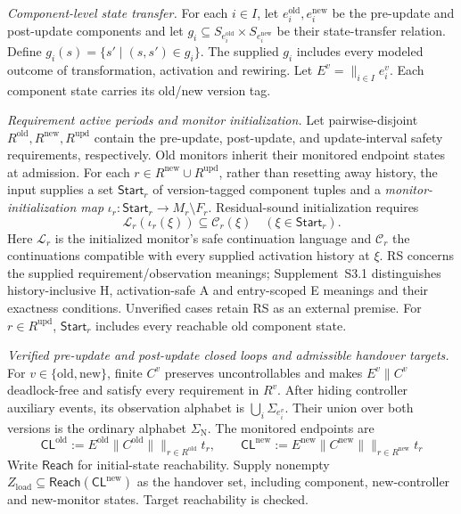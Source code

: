 \documentclass[acmsmall,screen,review,anonymous]{acmart}
\newcommand{\Reach}{\mathsf{Reach}}
\newcommand{\SigmaN}{\Sigma_{\mathrm{N}}}
\newcommand{\CLnew}{\mathsf{CL}^{\mathrm{new}}}
\begin{document}
\begin{definition}
\label{def:fg-inputs}
\label{def:update_plan}
\emph{Component-level state transfer.}
For each $i\in I$, let $e_i^{\mathrm{old}},e_i^{\mathrm{new}}$ be the pre-update and post-update components and let $g_i\subseteq S_{e_i^{\mathrm{old}}}\times S_{e_i^{\mathrm{new}}}$ be their state-transfer relation.
  Define $g_i(s)=\{s'\mid(s,s')\in g_i\}$. The supplied $g_i$ includes every modeled outcome of transformation, activation and rewiring. Let $E^v=\mathop{\parallel}_{i\in I}e_i^v$. Each component state carries its old/new version tag.

\par\noindent\emph{Requirement active periods and monitor initialization.}
Let pairwise-disjoint $R^{\mathrm{old}},R^{\mathrm{new}},R^{\mathrm{upd}}$ contain the pre-update, post-update, and update-interval safety requirements, respectively.
Old monitors inherit their monitored endpoint states at admission. For each $r\in R^{\mathrm{new}}\cup R^{\mathrm{upd}}$, rather than resetting away history, the input supplies a set $\mathsf{Start}_r$ of version-tagged component tuples and a \emph{monitor-initialization map} $\iota_r:\mathsf{Start}_r\to M_r\setminus F_r$.
Residual-sound initialization requires
  \[
    \mathcal L_r(\iota_r(\xi))\subseteq\mathcal C_r(\xi)
    \quad(\xi\in\mathsf{Start}_r).
    \tag{RS}\label{eq:residual-soundness}
  \]
Here $\mathcal L_r$ is the initialized monitor's safe continuation language and $\mathcal C_r$ the continuations compatible with every supplied activation history at $\xi$. RS concerns the supplied requirement/observation meanings; Supplement~S3.1 distinguishes history-inclusive H, activation-safe A and entry-scoped E meanings and their exactness conditions. Unverified cases retain RS as an external premise. For $r\in R^{\mathrm{upd}}$, $\mathsf{Start}_r$ includes every reachable old component state.

\par\noindent\emph{Verified pre-update and post-update closed loops and admissible handover targets.}
\label{def:endpoint_controllers}
For $v\in\{\mathrm{old},\mathrm{new}\}$, finite $C^v$ preserves uncontrollables and makes $E^v\parallel C^v$ deadlock-free and satisfy every requirement in $R^v$. After hiding controller auxiliary events, its observation alphabet is $\bigcup_i\Sigma_{e_i^v}$. Their union over both versions is the ordinary alphabet $\SigmaN$. The monitored endpoints are
  \[
  \mathsf{CL}^{\mathrm{old}}:=E^{\mathrm{old}}\parallel C^{\mathrm{old}}\parallel\mathop{\parallel}_{r\in R^{\mathrm{old}}}t_r,
  \qquad
  \CLnew:=E^{\mathrm{new}}\parallel C^{\mathrm{new}}\parallel\mathop{\parallel}_{r\in R^{\mathrm{new}}}t_r
  \]
Write $\Reach$ for initial-state reachability. Supply nonempty $Z_{\mathrm{load}}\subseteq\Reach(\CLnew)$ as the handover set, including component, new-controller and new-monitor states. Target reachability is checked.


\end{definition}
\end{document}
